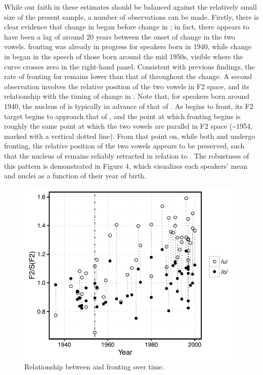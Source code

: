 \documentclass[12pt]{article}
\begin{document}
While our faith in these estimates should be balanced against the relatively small size of the present sample, a number of observations can be made. Firstly, there is clear evidence that change in  began before change in ; in fact, there appears to have been a lag of around 20 years between the onset of change in the two vowels.  fronting was already in progress for speakers born in 1940, while change in  began in the speech of those born around the mid 1950s, visible where the  curve crosses zero in the right-hand panel. Consistent with previous findings, the rate of fronting for  remains lower than that of  throughout the change. A second observation involves the relative position of the two vowels in F2 space, and its relationship with the timing of change in . Note that, for speakers born around 1940, the nucleus of  is typically in advance of that of . As  begins to front, its F2 target begins to approach that of , and the point at which  fronting begins is roughly the same point at which the two vowels are parallel in F2 space (\textasciitilde1954, marked with a vertical dotted line). From that point on, while both  and  undergo fronting, the relative position of the two vowels appears to be preserved, such that the nucleus of  remains reliably retracted in relation to . The robustness of this pattern is demonstrated in Figure 4, which visualizes each speakers' mean  and   nuclei as a function of their year of birth.

\vspace*{6pt}
\begin{figure}[H]
\centering
\includegraphics[scale=.9]{resistance1.pdf}
\caption{Relationship between  and  fronting over time.}
\end{figure}
\vspace*{6pt}
\end{document}
